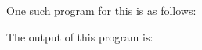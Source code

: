 \documentclass[12pt,letterpaper]{article}
\begin{document}
\begin{enumerate}
      \pagebreak

      One such program for this is as follows:


      The output of this program is:


  \end{enumerate}
\end{document}
